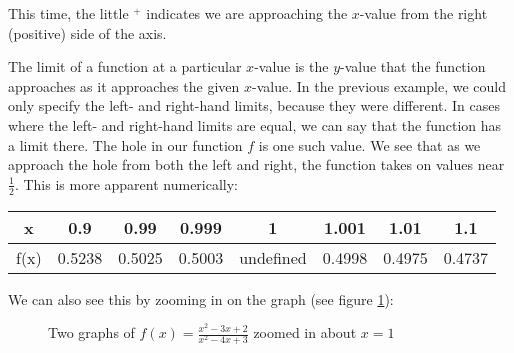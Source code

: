 This time, the little $^+$ indicates we are approaching the $x$-value from the 
right (positive) side of the axis. 

The limit of a function at a particular $ x $-value is the $ y $-value that the 
function approaches as it approaches the given $ x $-value. In the previous 
example, we could only specify the left- and right-hand limits, because they were 
different. In cases where the left- and right-hand limits are equal, we can say 
that the function has a limit there. The hole in our function $ f $ is one such 
value. We see that as we approach the hole from both the left and right, the 
function takes on values near $\frac{1}{2}$. This is more apparent numerically:


\begin{center}
\begin{tabular}{ |c|c|c|c|c|c|c|c| } 
 \hline
 x & 0.9 & 0.99 & 0.999 & 1 & 1.001 & 1.01 & 1.1 \\ 
 \hline
 f(x) & 0.5238 & 0.5025 & 0.5003 & undefined & 0.4998 & 0.4975 & 0.4737 \\ 
 \hline
\end{tabular}
\end{center}

We can also see this by zooming in on the graph (see figure \ref{holezoom}):

\begin{figure}[htbp]
\begin{subfigure}{0.5\textwidth}
\centering
    \end{subfigure}
    \begin{subfigure}{0.5\textwidth}
\centering
    \end{subfigure}
    \label{holezoom}
    \caption{Two graphs of $f(x) = \frac{x^2 - 3x + 2}{x^2 - 4x + 3}$ zoomed 
    in about $x = 1$}
    \end{figure}

